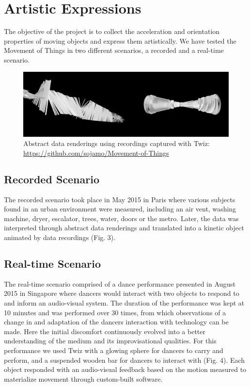 \documentclass{sigchi}
\begin{document}
\section{Artistic Expressions}

The objective of the project is to collect the acceleration
and orientation properties of moving objects and
express them artistically. We have tested the
Movement of Things in two different scenarios, a
recorded and a real-time scenario.

\begin{figure}[H]
\centering
\includegraphics[width=\columnwidth]{pics/renderings}
\caption{Abstract data renderings using recordings
captured with Twiz: {\url{https://github.com/sojamo/Movement-of-Things}}}
\label{fig:renderings}
\end{figure}

\subsection{Recorded Scenario}
The recorded scenario took place in May 2015 in Paris
where various subjects found in an urban environment
were measured, including an air vent, washing
machine, dryer, escalator, trees, water, doors or the
metro. Later, the data was interpreted
through abstract data renderings and translated into a
kinetic object animated by data recordings (Fig. 3).



\subsection{Real-time Scenario}
The real-time scenario comprised of a dance
performance presented in August 2015 in Singapore
where dancers would interact with two objects to
respond to and inform an audio-visual system. The
duration of the performance was kept at 10 minutes
and was performed over 30 times, from which
observations of a change in and adaptation of the
dancers interaction with technology can be made. Here
the initial discomfort continuously evolved into a better
understanding of the medium and its improvisational
qualities. For this performance we used Twiz with a glowing
sphere for dancers to carry and perform, and a
suspended wooden bar for dancers to interact with
(Fig. 4). Each object responded with
an audio-visual feedback based on the motion
measured to materialize movement \cite{hansen} through
custom-built software.
\end{document}
